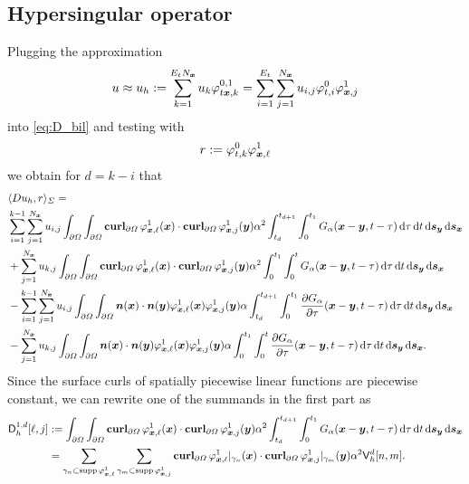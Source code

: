 \documentclass[a4paper,11pt]{article}
\begin{document}
\subsection{Hypersingular operator}

Plugging the approximation
\begin{equation*}
 u \approx u_h := \sum_{k=1}^{E_t N_{{\bm{x}}}} u_k \varphi^{0,1}_{t{{\bm{x}}},k} = \sum_{i=1}^{E_t} \sum_{j=1}^{N_{{\bm{x}}}} u_{i,j} \varphi^0_{t,i} \varphi^1_{{{\bm{x}}},j}
\end{equation*}
into \eqref{eq:D_bil} and testing with
\begin{equation*}
  r := \varphi^0_{t,k} \varphi^1_{{{\bm{x}}},\ell}
\end{equation*}
we obtain for $d=k-i$ that
\begin{align*}
  &\langle Du_h, r \rangle_\Sigma = \\ 
  &\sum_{i=1}^{k-1} \sum_{j=1}^{N_{{\bm{x}}}} u_{i,j}\int_{\partial\Omega} \int_{\partial\Omega} \operatorname{\mathbf{curl}}_{\partial\Omega} \varphi^1_{{{\bm{x}}},\ell}({{\bm{x}}}) \cdot \operatorname{\mathbf{curl}}_{\partial\Omega} \varphi^1_{{{\bm{x}}},j}({{\bm{y}}}) \alpha^2 \int_{t_{d}}^{t_{d+1}} \int_{0}^{t_1} G_\alpha({{\bm{x}}}-{{\bm{y}}},t-\tau) \,{\mathrm{d}}\tau \,{\mathrm{d}} t \,{\mathrm{d}}{{\bm{s}}}_{{\bm{y}}} \,{\mathrm{d}}{{\bm{s}}}_{{\bm{x}}} \\
    &+\sum_{j=1}^{N_{{\bm{x}}}} u_{k,j}\int_{\partial\Omega} \int_{\partial\Omega} \operatorname{\mathbf{curl}}_{\partial\Omega} \varphi^1_{{{\bm{x}}},\ell}({{\bm{x}}}) \cdot \operatorname{\mathbf{curl}}_{\partial\Omega} \varphi^1_{{{\bm{x}}},j}({{\bm{y}}}) \alpha^2 \int_{0}^{t_1} \int_{0}^{t} G_\alpha({{\bm{x}}}-{{\bm{y}}},t-\tau) \,{\mathrm{d}}\tau \,{\mathrm{d}} t \,{\mathrm{d}}{{\bm{s}}}_{{\bm{y}}} \,{\mathrm{d}}{{\bm{s}}}_{{\bm{x}}} \\
  &- \sum_{i=1}^{k-1} \sum_{j=1}^{N_{{\bm{x}}}} u_{i,j} \int_{\partial\Omega} \int_{\partial\Omega} {{\bm{n}}}({{\bm{x}}}) \cdot {\ensuremath{{\bm{n}}}}({{\bm{y}}}) \varphi^1_{{{\bm{x}}},\ell}({{\bm{x}}}) \varphi^1_{{{\bm{x}}},j}({{\bm{y}}}) \alpha \int_{t_d}^{t_{d+1}} \int_0^{t_1} \frac{\partial G_\alpha}{\partial \tau}({{\bm{x}}}-{{\bm{y}}},t-\tau) \,{\mathrm{d}}\tau \,{\mathrm{d}} t \,{\mathrm{d}}{{\bm{s}}}_{{\bm{y}}} \,{\mathrm{d}}{{\bm{s}}}_{{\bm{x}}} \\
    &- \sum_{j=1}^{N_{{\bm{x}}}} u_{k,j} \int_{\partial\Omega} \int_{\partial\Omega} {{\bm{n}}}({{\bm{x}}}) \cdot {\ensuremath{{\bm{n}}}}({{\bm{y}}}) \varphi^1_{{{\bm{x}}},\ell}({{\bm{x}}}) \varphi^1_{{{\bm{x}}},j}({{\bm{y}}}) \alpha \int_{0}^{t_1} \int_0^{t} \frac{\partial G_\alpha}{\partial \tau}({{\bm{x}}}-{{\bm{y}}},t-\tau) \,{\mathrm{d}}\tau \,{\mathrm{d}} t \,{\mathrm{d}}{{\bm{s}}}_{{\bm{y}}} \,{\mathrm{d}}{{\bm{s}}}_{{\bm{x}}}.
\end{align*}
Since the surface curls of spatially piecewise linear functions are piecewise constant, we can rewrite one of the summands in the first part as
\begin{align*}
  {\ensuremath{{\mathsf{D}}}}^{1,d}_h[\ell,j] &:= \int_{\partial\Omega} \int_{\partial\Omega}\operatorname{\mathbf{curl}}_{\partial\Omega} \varphi^1_{{{\bm{x}}},\ell}({{\bm{x}}}) \cdot \operatorname{\mathbf{curl}}_{\partial\Omega} \varphi^1_{{{\bm{x}}},j}({{\bm{y}}}) \alpha^2 \int_{t_{d}}^{t_{d+1}} \int_{0}^{t_1} G_\alpha({{\bm{x}}}-{{\bm{y}}},t-\tau) \,{\mathrm{d}}\tau \,{\mathrm{d}} t \,{\mathrm{d}}{{\bm{s}}}_{{\bm{y}}} \,{\mathrm{d}}{{\bm{s}}}_{{\bm{x}}} \\
  &= \sum_{\gamma_n \subset \operatorname{supp} \varphi^1_{{{\bm{x}}},\ell}} \sum_{\gamma_m \subset \operatorname{supp} \varphi^1_{{{\bm{x}}},j}} \operatorname{\mathbf{curl}}_{\partial\Omega} \varphi^1_{{{\bm{x}}},\ell}|_{\gamma_n}({{\bm{x}}}) \cdot \operatorname{\mathbf{curl}}_{\partial\Omega} \varphi^1_{{{\bm{x}}},j}|_{\gamma_m}({{\bm{y}}}) \alpha^2 {{\mathsf{V}}}_h^d[n,m].
\end{align*}
\end{document}
